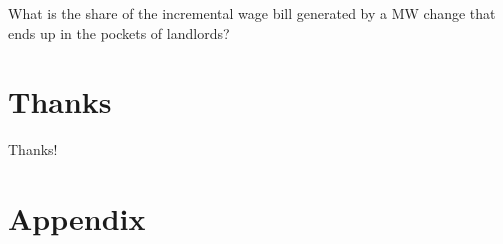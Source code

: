 \documentclass[aspectratio=169]{beamer}
\begin{document}
\begin{frame}
    What is the share of the incremental wage bill generated by a MW change that ends up 
    in the pockets of landlords? 
\end{frame}

\section*{Thanks}

\begin{frame}
    Thanks!
\end{frame}


\appendix

\renewcommand\thetable{\thesection.\arabic{table}} 
\renewcommand\thefigure{\thesection.\arabic{figure}} 
\setcounter{table}{0}
\setcounter{figure}{0}

\section{Appendix}
\end{document}
